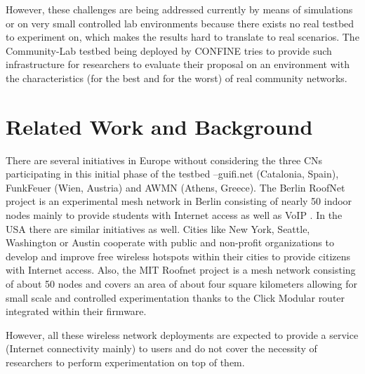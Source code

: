 \documentclass[conference]{IEEEtran}
\begin{document}

However, these challenges are being addressed currently by means of simulations 
or on very small controlled lab environments because there exists no real testbed
to experiment on, which makes the results hard to translate to real scenarios. The Community-Lab testbed
being deployed by CONFINE tries to provide such infrastructure for researchers to evaluate
their proposal on an environment with the characteristics (for the best and for the worst)
of real community networks.

\section{Related Work and Background}
\label{sec:related-work}

There are several initiatives in Europe without considering the three CNs participating in this initial
phase of the testbed --guifi.net (Catalonia, Spain), FunkFeuer (Wien, Austria) and AWMN (Athens, Greece). The Berlin RoofNet project is an
experimental mesh network in Berlin consisting of nearly 50 indoor nodes mainly to provide
students with Internet access as well as VoIP \cite{berlin-roofnet}. In the USA there are similar initiatives as well. Cities like New York, Seattle, Washington or Austin cooperate with
public and non-profit organizations to develop and improve free wireless hotspots within 
their cities to provide citizens with Internet access. Also, the MIT Roofnet \cite{mit-roofnet} project
is a mesh network consisting of about 50 nodes and covers an area of about four square
kilometers allowing for small scale and controlled experimentation thanks to the
Click Modular router integrated within their firmware. 

However, all these wireless network deployments 
are expected to provide a service (Internet connectivity mainly) to users and do not
cover the necessity of researchers to perform experimentation on top of them.

\end{document}

